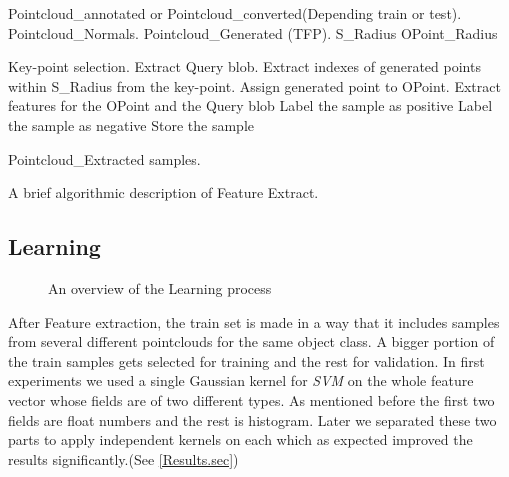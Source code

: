 \begin{algorithm}[t]
\begin{algorithmic}[1]
\REQUIRE Pointcloud\_annotated or Pointcloud\_converted(Depending train or test).
\REQUIRE Pointcloud\_Normals.
\REQUIRE Pointcloud\_Generated (TFP).
\REQUIRE S\_Radius
\REQUIRE OPoint\_Radius
\medskip

\STATE Key-point selection.
  \STATE Extract Query blob.
  \STATE Extract indexes of generated points within S\_Radius from the key-point.
    \STATE Assign generated point to OPoint.
    \STATE Extract features for the OPoint and the Query blob
	\STATE Label the sample as positive
      \ELSE
	\STATE Label the sample as negative
      \ENDIF
     \ENDIF
   \ENDFOR
     \STATE Store the sample
\ENDFOR

\medskip
\ENSURE Pointcloud\_Extracted samples.
\end{algorithmic}
\caption[Feature Extract.]
{A brief algorithmic description of Feature Extract.}
\label{FeatureEXtract.algorithm}
\end{algorithm}





\subsection{Learning}
\label{Learning.ssec}

\begin{figure}[t]
  \caption[Learning overview]
  {An overview of the Learning process}
  \label{LearningFlowchart.figure}
\end{figure}

After Feature extraction, the train set is made in a way that it includes samples from several different pointclouds for the same object class. A bigger portion of the train samples gets selected for training and the rest for validation. In first experiments we used a single Gaussian kernel for {\it SVM} on the whole feature vector whose fields are of two different types. As mentioned before the first two fields are float numbers and the rest is histogram. Later we separated these two parts to apply independent kernels on each which as expected improved the results significantly.(See \ref{Results.sec}) 


